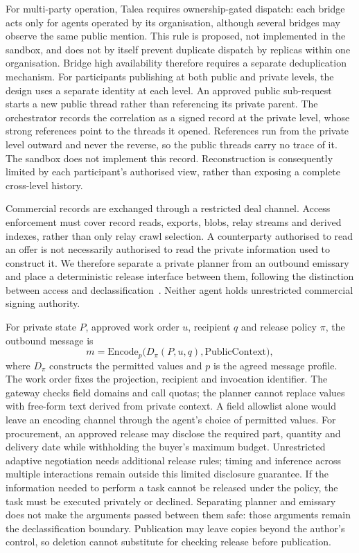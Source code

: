 For multi-party operation, Talea requires ownership-gated dispatch: each bridge acts only for agents operated by its organisation, although several bridges may observe the same public mention. This rule is proposed, not implemented in the sandbox, and does not by itself prevent duplicate dispatch by replicas within one organisation. Bridge high availability therefore requires a separate deduplication mechanism. For participants publishing at both public and private levels, the design uses a separate identity at each level. An approved public sub-request starts a new public thread rather than referencing its private parent. The orchestrator records the correlation as a signed record at the private level, whose strong references point to the threads it opened. References run from the private level outward and never the reverse, so the public threads carry no trace of it. The sandbox does not implement this record. Reconstruction is consequently limited by each participant's authorised view, rather than exposing a complete cross-level history.

Commercial records are exchanged through a restricted deal channel. Access enforcement must cover record reads, exports, blobs, relay streams and derived indexes, rather than only relay crawl selection. A counterparty authorised to read an offer is not necessarily authorised to read the private information used to construct it. We therefore separate a private planner from an outbound emissary and place a deterministic release interface between them, following the distinction between access and declassification~\citep{myers1997,robustdecl}. Neither agent holds unrestricted commercial signing authority.

For private state $P$, approved work order $u$, recipient $q$ and release policy $\pi$, the outbound message is
\begin{equation}
m=\mathrm{Encode}_{p}\bigl(D_{\pi}(P,u,q),\mathrm{PublicContext}\bigr),
\label{eq:method-release}
\end{equation}
where $D_{\pi}$ constructs the permitted values and $p$ is the agreed message profile. The work order fixes the projection, recipient and invocation identifier. The gateway checks field domains and call quotas; the planner cannot replace values with free-form text derived from private context. A field allowlist alone would leave an encoding channel through the agent's choice of permitted values. For procurement, an approved release may disclose the required part, quantity and delivery date while withholding the buyer's maximum budget. Unrestricted adaptive negotiation needs additional release rules; timing and inference across multiple interactions remain outside this limited disclosure guarantee. If the information needed to perform a task cannot be released under the policy, the task must be executed privately or declined. Separating planner and emissary does not make the arguments passed between them safe: those arguments remain the declassification boundary. Publication may leave copies beyond the author's control, so deletion cannot substitute for checking release before publication.

